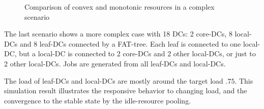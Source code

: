 \begin{figure}[tb]
  \caption{Comparison of convex and monotonic resources in a complex scenario}

  \label{fig:figures}
  \end{figure}

The last scenario shows a more complex case with 18 DCs: 2 core-DCs, 8
local-DCs and 8 leaf-DCs connected by a FAT-tree.  Each leaf is
connected to one local-DC, but a local-DC is connected to 2 core-DCs
and 2 other local-DCs, or just to 2 other local-DCs.
Jobs are generated from all leaf-DCs and local-DCs.

The load of leaf-DCs and local-DCs are mostly around the target load
$.75$.
This simulation result illustrates
the responsive behavior to changing load,
and the convergence to the stable state by the idle-resource pooling.

